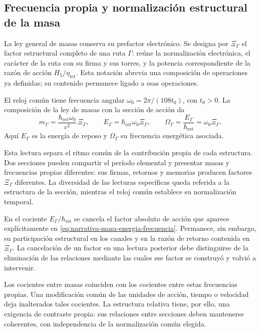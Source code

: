 \subsection{Frecuencia propia y normalización estructural de la masa}
\label{subsec:narrativa-masa-frecuencia}

La ley general de masas conserva su prefactor electrónico. Se designa por
$\Xi_\Gamma$ el factor estructural completo de una ruta $\Gamma$: reúne la
normalización electrónica, el carácter de la ruta con su firma y sus torres,
y la potencia correspondiente de la razón de acción
$H_5/\eta_{\mathrm{ret}}$. Esta notación abrevia una composición de
operaciones ya definidas; su contenido permanece ligado a esas operaciones.

El reloj común tiene frecuencia angular
$\omega_0=2\pi/(108t_0)$, con $t_0>0$. La composición de la ley de masas con la sección
de acción da
\begin{equation}
 \boxed{
 m_\Gamma=\frac{\hbar_{\mathrm{ret}}\omega_0}{c^2}\,\Xi_\Gamma,
 \qquad
 E_\Gamma=\hbar_{\mathrm{ret}}\omega_0\Xi_\Gamma,
 \qquad
 \Omega_\Gamma=\frac{E_\Gamma}{\hbar_{\mathrm{ret}}}
             =\omega_0\Xi_\Gamma.}
 \label{eq:narrativa-masa-energia-frecuencia}
\end{equation}
Aquí $E_\Gamma$ es la energía de reposo y $\Omega_\Gamma$ su frecuencia
energética asociada.

Esta lectura separa el ritmo común de la contribución propia de cada
estructura. Dos secciones pueden compartir el período elemental y presentar
masas y frecuencias propias diferentes: sus firmas, retornos y memorias
producen factores $\Xi_\Gamma$ diferentes. La diversidad de las lecturas
específicas queda referida a la estructura de la sección, mientras el reloj
común establece su normalización temporal.

En el cociente $E_\Gamma/\hbar_{\mathrm{ret}}$ se cancela el factor
absoluto de acción que aparece explícitamente en
\eqref{eq:narrativa-masa-energia-frecuencia}. Permanece, sin embargo, su
participación estructural en los canales y en la razón de retorno contenida
en $\Xi_\Gamma$. La cancelación de un factor en una lectura posterior
debe distinguirse de la eliminación de las relaciones mediante las cuales
ese factor se construyó y volvió a intervenir.

Los cocientes entre masas coinciden con los cocientes entre estas frecuencias
propias. Una modificación común de las unidades de acción, tiempo o velocidad
deja inalterados tales cocientes. La estructura relativa tiene, por ello,
una exigencia de contraste propia: sus relaciones entre secciones deben
mantenerse coherentes, con independencia de la normalización común elegida.

